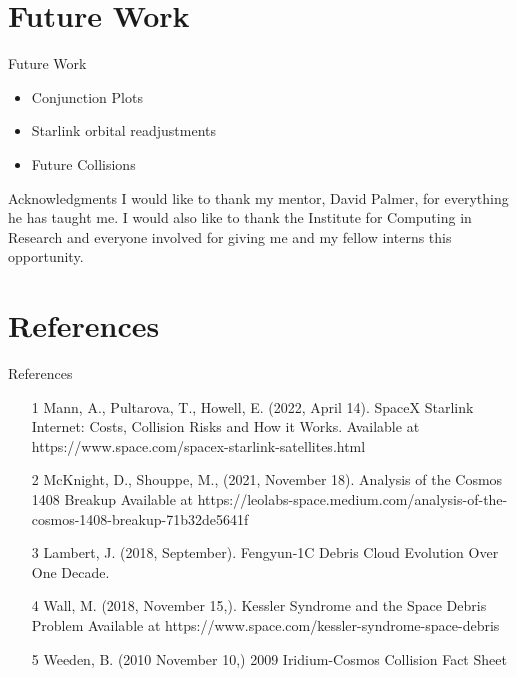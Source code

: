 \documentclass{beamer}
\begin{document}
\section{Future Work}
\begin{frame}{Future Work}
\begin{itemize}
\item Conjunction Plots
\item Starlink orbital readjustments
\item Future Collisions
\end{itemize}
\end{frame}

\begin{frame}{Acknowledgments}
I would like to thank my mentor, David Palmer, for everything he has taught me.
\vfill
I would also like to thank the Institute for Computing in Research and everyone involved for giving me and my fellow interns this opportunity.
\end{frame}

\section{References}
\begin{frame}{References}
\begin{itemize}
\item [1] Mann, A., Pultarova, T.,  Howell, E. (2022, April 14). SpaceX Starlink Internet: Costs, Collision Risks and How it Works. Available at https://www.space.com/spacex-starlink-satellites.html
\item [2] McKnight, D., Shouppe, M., (2021, November 18). Analysis of the Cosmos 1408 Breakup Available at https://leolabs-space.medium.com/analysis-of-the-cosmos-1408-breakup-71b32de5641f
\item [3] Lambert, J. (2018, September). Fengyun-1C Debris Cloud Evolution Over One Decade. %
\item [4]  Wall, M. (2018, November 15,). Kessler Syndrome and the Space Debris Problem Available at https://www.space.com/kessler-syndrome-space-debris
\item [5] Weeden, B. (2010 November 10,) 2009 Iridium-Cosmos Collision Fact Sheet %
\end{itemize}
\end{frame}
\end{document}
